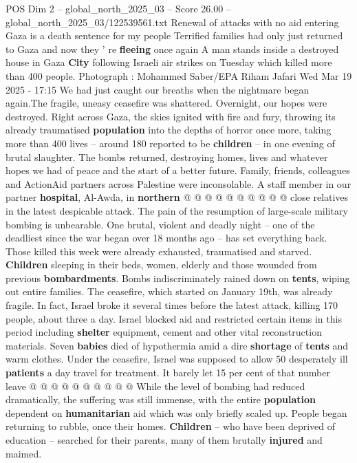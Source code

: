 \begin{textsample}{POS Dim 2 – global\_north\_2025\_03 – Score 26.00 – global\_north\_2025\_03/122539561.txt}  \label{ex:f2_pos_406}
Renewal of attacks with no aid entering Gaza is a death sentence for my people Terrified families had only just returned to Gaza and now they ' re \textbf{fleeing} once again A man stands inside a destroyed house in Gaza \textbf{City} following Israeli air strikes on Tuesday which killed more than 400 people.
Photograph : Mohammed Saber/EPA Riham Jafari Wed Mar 19 2025 - 17:15 We had just caught our breaths when the nightmare began again.The fragile, uneasy ceasefire was shattered.
Overnight, our hopes were destroyed.
Right across Gaza, the skies ignited with fire and fury, throwing its already traumatised \textbf{population} into the depths of horror once more, taking more than 400 lives -- around 180 reported to be \textbf{children} -- in one evening of brutal slaughter.
The bombs returned, destroying homes, lives and whatever hopes we had of peace and the start of a better future.
Family, friends, colleagues and ActionAid partners across Palestine were inconsolable.
A staff member in our partner \textbf{hospital}, Al-Awda, in \textbf{northern} @ @ @ @ @ @ @ @ @ @ close relatives in the latest despicable attack.
The pain of the resumption of large-scale military bombing is unbearable.
One brutal, violent and deadly night -- one of the deadliest since the war began over 18 months ago -- has set everything back.
Those killed this week were already exhausted, traumatised and starved. \textbf{Children} sleeping in their beds, women, elderly and those wounded from previous \textbf{bombardments}.
Bombs indiscriminately rained down on \textbf{tents}, wiping out entire families.
The ceasefire, which started on January 19th, was already fragile.
In fact, Israel broke it several times before the latest attack, killing 170 people, about three a day.
Israel blocked aid and restricted certain items in this period including \textbf{shelter} equipment, cement and other vital reconstruction materials.
Seven \textbf{babies} died of hypothermia amid a dire \textbf{shortage} of \textbf{tents} and warm clothes.
Under the ceasefire, Israel was supposed to allow 50 desperately ill \textbf{patients} a day travel for treatment.
It barely let 15 per cent of that number leave @ @ @ @ @ @ @ @ @ @ While the level of bombing had reduced dramatically, the suffering was still immense, with the entire \textbf{population} dependent on \textbf{humanitarian} aid which was only briefly scaled up.
People began returning to rubble, once their homes. \textbf{Children} -- who have been deprived of education -- searched for their parents, many of them brutally \textbf{injured} and maimed.

\end{textsample}

